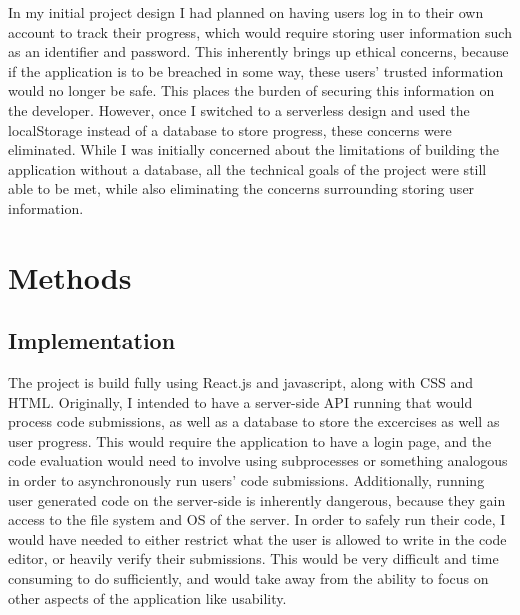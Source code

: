\documentclass[10pt,twocolumn]{article}
\begin{document}
In my initial project design I had planned on having users log in to their own account to track their progress, which 
would require storing user information such as an identifier and password. This inherently brings up ethical concerns, 
because if the application is to be breached in some way, these users' trusted information would no longer be safe. This 
places the burden of securing this information on the developer. However, once I switched to a serverless 
design and used the localStorage instead of a database to store progress, these concerns were eliminated. While I was 
initially concerned about the limitations of building the application without a database, all the technical goals of the 
project were still able to be met, while also eliminating the concerns surrounding storing user information. 

\section{Methods} 



\subsection{Implementation}

The project is build fully using React.js and javascript, along with CSS and HTML. Originally, I intended to have a server-side 
API running that would process code submissions, as well as a database to store the excercises as well as user progress. This 
would require the application to have a login page, and the code evaluation would need to involve using subprocesses or something 
analogous in order to asynchronously run users' code submissions. Additionally, running user generated code on the server-side 
is inherently dangerous, because they gain access to the file system and OS of the server. In order to safely run their code,
I would have needed to either restrict what the user is allowed to write in the code editor, or heavily verify their submissions. 
This would be very difficult and time consuming to do sufficiently, and would take away from the ability to focus on other aspects 
of the application like usability. 
\end{document}
